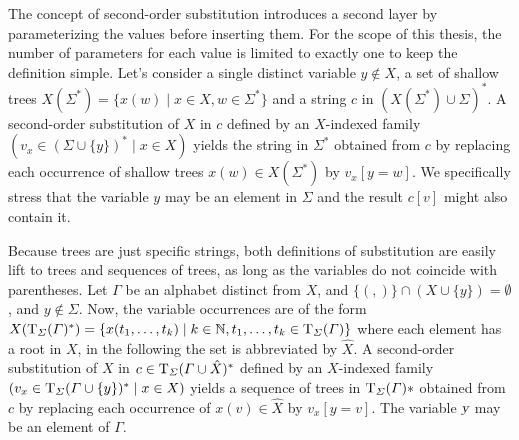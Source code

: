 \documentclass[../document.tex]{subfiles}
\begin{document}
    The concept of second-order substitution introduces a second layer by parameterizing the values before inserting them.
    For the scope of this thesis, the number of parameters for each value is limited to exactly one to keep the definition simple.
    Let's consider a single distinct variable \(y \notin X\), a set of shallow trees \(X(\varSigma^*) = \{ x(w) \mid x \in X, w \in \Sigma^* \}\) and a string \(c\) in \((X(\varSigma^*) \cup \varSigma)^*\).
    A second-order substitution of \(X\) in \(c\) defined by an \(X\)-indexed family \((v_x \in (\varSigma \cup \{y\})^* \mid x \in X)\) yields the string in \(\varSigma^*\) obtained from \(c\) by replacing each occurrence of shallow trees \(x(w) \in X(\varSigma^*)\) by \(v_x[y=w]\).
    We specifically stress that the variable \(y\) may be an element in \(\varSigma\) and the result \(c[v]\) might also contain it.

    Because trees are just specific strings, both definitions of substitution are easily lift to trees and sequences of trees, as long as the variables do not coincide with parentheses.
    Let \(\varGamma\) be an alphabet distinct from \(X\), and \(\{ (, ) \} \cap (X \cup \{y\}) = \emptyset\), and \(y \notin \varSigma\).
    Now, the variable occurrences are of the form \(X(\operatorname{T}_\varSigma(\varGamma)^*) = \{x(t_1, \ldots, t_k) \mid k \in \mathbb{N}, t_1, \ldots, t_k \in \operatorname{T}_{\varSigma}(\varGamma)\}\) where each element has a root in \(X\), in the following the set is abbreviated by \(\hat{X}\).
    A second-order substitution of \(X\) in \(c \in \operatorname{T}_\varSigma(\varGamma \cup \hat{X})^*\) defined by an \(X\)-indexed family \((v_x \in \operatorname{T}_\varSigma(\varGamma \cup \{y\})^* \mid x \in X)\) yields a sequence of trees in \(\operatorname{T}_\varSigma(\varGamma)*\) obtained from \(c\) by replacing each occurrence of \(x(v) \in \hat{X}\) by \(v_x[y=v]\).
    The variable \(\textsl{y}\) may be an element of \(\varGamma\).
\end{document}

